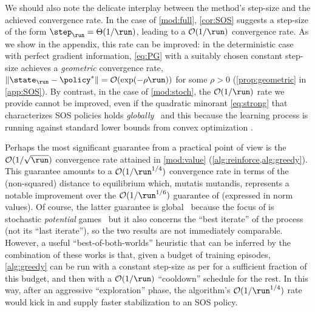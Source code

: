 We should also note the delicate interplay between the method's step-size and the achieved convergence rate.
In the case of \cref{mod:full}, \cref{cor:SOS} suggests a step-size of the form $\curr[\step] = \Theta(1/\run)$, leading to a $\bigoh(1/\run)$ convergence rate.
As we show in the appendix, this rate can be improved:
in the deterministic case with perfect gradient information, \eqref{eq:PG} with a suitably chosen constant step-size achieves a \emph{geometric} convergence rate, \ie $\norm{\curr - \eq} = \bigoh(\exp(-\rho\run))$ for some $\rho>0$ (\cf \cref{prop:geometric} in \cref{app:SOS}).
By contrast, in the case of \cref{mod:stoch}, the $\bigoh(1/\run)$ rate we provide cannot be improved, even if the quadratic minorant \eqref{eq:strong} that characterizes \ac{SOS} policies holds \emph{globally} \textendash\ and this because the learning process is running against standard lower bounds from convex optimization \cite{Nes04,Bub15}.

Perhaps the most significant guarantee from a practical point of view is the $\bigoh(1/\sqrt{\run})$ convergence rate attained in \cref{mod:value} (\cf \cref{alg:reinforce,alg:greedy}).
This guarantee amounts to a $\bigoh(1/\run^{1/4})$ convergence rate in terms of the (non-squared) distance to equilibrium which, mutatis mutandis, represents a notable improvement over the $\bigoh(1/\run^{1/6})$ guarantee of \citet{LOPP22} (expressed in norm values).
Of course, the latter guarantee is global \textendash\ because the focus of \cite{LOPP22} is stochastic \emph{potential} games \textendash\ but it also concerns the ``best iterate'' of the process (not its ``last iterate''), so the two results are not immediately comparable.
However, a useful ``best-of-both-worlds'' heuristic that can be inferred by the combination of these works is that, given a budget of training episodes, \cref{alg:greedy} can be run with a constant step-size as per \cite{LOPP22} for a sufficient fraction of this budget, and then with a $\bigoh(1/\run)$ ``cooldown'' schedule for the rest.
In this way, after an aggressive ``exploration'' phase, the algorithm's $\bigoh(1/\run^{1/4})$ rate would kick in and supply faster stabilization to an \ac{SOS} policy.



